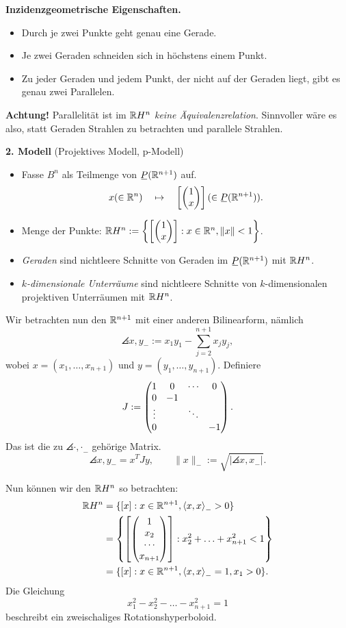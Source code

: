 \textbf{Inzidenzgeometrische Eigenschaften.}
\begin{itemize}
  \item Durch je zwei Punkte geht genau eine Gerade.
  \item Je zwei Geraden schneiden sich in höchstens einem Punkt.
  \item Zu jeder Geraden und jedem Punkt, der nicht auf der Geraden liegt, gibt
    es genau zwei Parallelen.
\end{itemize}


\textbf{Achtung!} Parallelität ist im $\mathbb{R} H^n$ \emph{keine
  Äquivalenzrelation}. Sinnvoller wäre es also, statt Geraden Strahlen zu
betrachten und parallele Strahlen.

\textbf{2. Modell} (Projektives Modell, p-Modell)
\begin{itemize}
  \item Fasse $B^n$ als Teilmenge von $\proj(\real^{n+1})$ auf.
  \[ x (\in \real^n) \quad \mapsto \quad \left[ \pmat{1 \\ x} \right] (\in
    \proj(\real^{n+1})). \]
  \item Menge der Punkte: $\mathbb{R} H^n := \left\{ \left[ \begin{pmatrix}1 \\ x\end{pmatrix} \right]
      : x \in \mathbb{R}^n, \| x \| < 1 \right\}$.
  \item \emph{Geraden} sind nichtleere Schnitte von Geraden im
    $\proj(\real^{n+1})$ mit $\mathbb{R} H^n$.
  \item \emph{$k$-dimensionale Unterräume} sind nichtleere Schnitte von
    $k$-dimensionalen projektiven Unterräumen mit $\mathbb{R} H^n$.
\end{itemize}

Wir betrachten nun den $\mathbb{R}^{n+1}$ mit einer anderen Bilinearform, nämlich
\[ \angles{x,y}_- := x_1 y_1 - \sum_{j=2}^{n+1} x_j y_j, \]
wobei $x = (x_1, \ldots, x_{n+1})$ und $y = (y_1, \ldots, y_{n+1})$. Definiere
\[ J := \begin{pmatrix}
    1 & 0 & \cdots & 0 \\
    0 & -1 \\
    \vdots & & \ddots \\
    0 & & & -1
  \end{pmatrix}. \]
Das ist die zu $\angles{\cdot,\cdot}_-$ gehörige Matrix.
\[ \angles{x,y}_- = x^T J y, \qquad \| x \|_- := \sqrt{|\angles{x,x}_-|}. \]

Nun können wir den $\mathbb{R} H^n$ so betrachten:
\[ \begin{aligned}
    \mathbb{R} H^n &= \{ [x] : x \in \mathbb{R}^{n+1}, \left\langle x,x \right\rangle_- > 0 \} \\
  &= \left\{ \left[ \begin{pmatrix} 1 \\ x_2 \\ \cdots \\ x_{n+1} \end{pmatrix} \right] : x_2^2 +
    \ldots + x_{n+1}^2 < 1  \right\} \\
  &= \{ [x] : x \in \mathbb{R}^{n+1}, \left\langle x,x \right\rangle_- = 1, x_1 > 0 \}.
\end{aligned} \]
Die Gleichung
\[ x_1^2 - x_2^2 - \ldots - x_{n+1}^2 = 1 \]
beschreibt ein zweischaliges Rotationshyperboloid.

